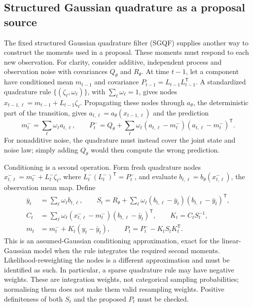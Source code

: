 \documentclass[11pt]{article}
\begin{document}
\subsection{Structured Gaussian quadrature as a proposal source}

The fixed structured Gaussian quadrature filter (SGQF) supplies another way to
construct the moments used in a proposal. These moments must respond to each
new observation. For clarity, consider additive, independent process and
observation noise with covariances $Q_\theta$ and $R_\theta$. At time $t-1$,
let a component have conditioned mean $m_{t-1}$ and covariance
$P_{t-1}=L_{t-1}L_{t-1}^{\mathsf T}$. A standardized quadrature rule
$\{(\zeta_\ell,\omega_\ell)\}$, with $\sum_\ell\omega_\ell=1$, gives nodes
$x_{t-1,\ell}=m_{t-1}+L_{t-1}\zeta_\ell$. Propagating these nodes through
$a_\theta$, the deterministic part of the transition, gives
$a_{t,\ell}=a_\theta(x_{t-1,\ell})$ and the prediction
\begin{equation}
 m_t^-=\sum_\ell \omega_\ell a_{t,\ell},\qquad
 P_t^-=Q_\theta+\sum_\ell\omega_\ell
       (a_{t,\ell}-m_t^-)(a_{t,\ell}-m_t^-)^\mathsf T.
                                                        \label{eq:sgqf-moments}
\end{equation}
For nonadditive noise, the quadrature must instead cover the joint state and
noise law; simply adding $Q_\theta$ would then compute the wrong prediction.

Conditioning is a second operation. Form fresh quadrature nodes
$x_{t,\ell}^-=m_t^-+L_t^-\zeta_\ell$, where
$L_t^-(L_t^-)^{\mathsf T}=P_t^-$, and evaluate
$b_{t,\ell}=b_\theta(x_{t,\ell}^-)$, the observation mean map. Define
\begin{align}
 \bar y_t&=\sum_\ell\omega_\ell b_{t,\ell},\qquad
 S_t=R_\theta+\sum_\ell\omega_\ell
 (b_{t,\ell}-\bar y_t)(b_{t,\ell}-\bar y_t)^{\mathsf T},\nonumber\\
 C_t&=\sum_\ell\omega_\ell(x_{t,\ell}^--m_t^-)
                         (b_{t,\ell}-\bar y_t)^{\mathsf T},\qquad
 K_t=C_t S_t^{-1},\nonumber\\
 m_t&=m_t^-+K_t(y_t-\bar y_t),\qquad
 P_t=P_t^--K_t S_t K_t^{\mathsf T}.       \label{eq:sgqf-conditioning}
\end{align}
This is an assumed-Gaussian conditioning approximation, exact for the
linear-Gaussian model when the rule integrates the required second moments.
Likelihood-reweighting the nodes is a different approximation and must be
identified as such. In particular, a sparse quadrature rule may have negative
weights. These are integration weights, not categorical sampling probabilities;
normalising them does not make them valid resampling weights. Positive
definiteness of both $S_t$ and the proposed $P_t$ must be checked.
\end{document}
